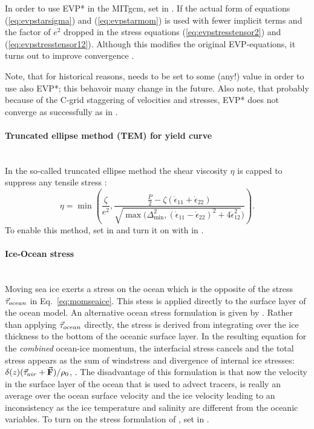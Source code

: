 In order to use EVP* in the MITgcm, set  in . If 
the actual form of equations (\ref{eq:evpstarsigma}) and
(\ref{eq:evpstarmom}) is used with fewer implicit terms and the factor
of $e^{2}$ dropped in the stress equations (\ref{eq:evpstresstensor2})
and (\ref{eq:evpstresstensor12}). Although this modifies the original
EVP-equations, it turns out to improve convergence \citep{bouillon13}.

Note, that for historical reasons,  needs to
be set to some (any!) value in order to use also EVP*; this behavoir
many change in the future. Also note, that
probably because of the C-grid staggering of velocities and stresses,
EVP* does not converge as successfully as in \citet{kimmritz15}.

\paragraph{Truncated ellipse method (TEM) for yield curve \label{sec:pkg:seaice:TEM}}~\\
%
In the so-called truncated ellipse method the shear viscosity $\eta$
is capped to suppress any tensile stress \citep{hibler97, geiger98}:
\begin{equation}
  \label{eq:etatem}
  \eta = \min\left(\frac{\zeta}{e^2},
  \frac{\frac{P}{2}-\zeta(\dot{\epsilon}_{11}+\dot{\epsilon}_{22})}
  {\sqrt{\max(\Delta_{\min}^{2},(\dot{\epsilon}_{11}-\dot{\epsilon}_{22})^2
      +4\dot{\epsilon}_{12}^2})}\right).
\end{equation}
To enable this method, set  in
 and turn it on with
 in . 

\paragraph{Ice-Ocean stress \label{sec:pkg:seaice:iceoceanstress}}~\\
%
Moving sea ice exerts a stress on the ocean which is the opposite of
the stress $\vec{\mathbf{\mathbf{\tau}}}_{ocean}$ in Eq.~\ref{eq:momseaice}. This stess is
applied directly to the surface layer of the ocean model. An
alternative ocean stress formulation is given by \citet{hibler87}.
Rather than applying $\vec{\mathbf{\mathbf{\tau}}}_{ocean}$ directly, the stress is derived
from integrating over the ice thickness to the bottom of the oceanic
surface layer. In the resulting equation for the \emph{combined}
ocean-ice momentum, the interfacial stress cancels and the total
stress appears as the sum of windstress and divergence of internal ice
stresses: $\delta(z) (\vec{\mathbf{\mathbf{\tau}}}_{air} + \vec{\mathbf{F}})/\rho_0$, \citep[see also
Eq.\,2 of][]{hibler87}. The disadvantage of this formulation is that
now the velocity in the surface layer of the ocean that is used to
advect tracers, is really an average over the ocean surface
velocity and the ice velocity leading to an inconsistency as the ice
temperature and salinity are different from the oceanic variables.
To turn on the stress formulation of \citet{hibler87}, set
 in .


